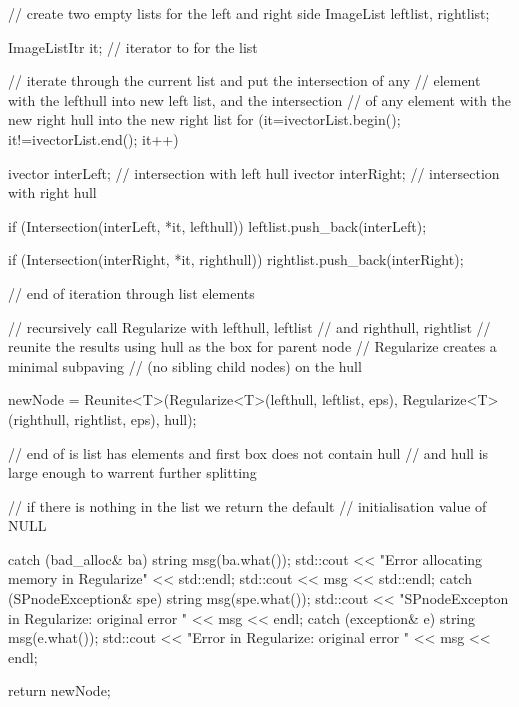 \begin{DoxyCode}
{{{            // create two empty lists for the left and right side
            ImageList leftlist, rightlist;

            ImageListItr it; // iterator to for the list

            // iterate through the current list and put the intersection of any
            // element with the lefthull into new left list, and the
       intersection
            // of any element with the new right hull into the new right list
            for (it=ivectorList.begin(); it!=ivectorList.end(); it++) {
                ivector interLeft;  // intersection with left hull
                ivector interRight;  // intersection with right hull

                if (Intersection(interLeft, *it, lefthull)) {
                    leftlist.push_back(interLeft);
                }

                if (Intersection(interRight, *it, righthull)) {
                    rightlist.push_back(interRight);
                }

            } // end of iteration through list elements

            // recursively call Regularize with lefthull, leftlist
            // and righthull, rightlist
            // reunite the results using hull as the box for parent node
            // Regularize creates a minimal subpaving
            // (no sibling child nodes) on the hull

            newNode = Reunite<T>(Regularize<T>(lefthull, leftlist, eps),
                                Regularize<T>(righthull,
                                            rightlist, eps), hull);

        } // end of is list has elements and first box does not contain hull
            // and hull is large enough to warrent further splitting

        // if there is nothing in the list we return the default
            // initialisation value of NULL
    }
    catch (bad_alloc& ba)
    {
        string msg(ba.what());
        std::cout << "Error allocating memory in Regularize" << std::endl;
        std::cout << msg << std::endl;
    }
    catch (SPnodeException& spe) {
        string msg(spe.what());
        std::cout << "SPnodeExcepton in Regularize: original error "
                                            << msg << endl;
    }
    catch (exception& e) {
        string msg(e.what());
        std::cout << "Error in Regularize: original error " << msg << endl;
    }

    return newNode;

}
\end{DoxyCode}
